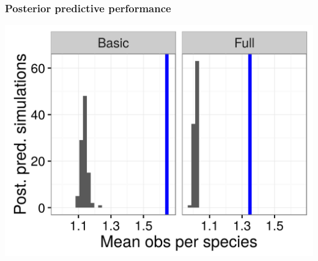 \documentclass{beamer}
\begin{document}
\begin{frame}
  \frametitle{Posterior predictive performance}
  \begin{center}
    \includegraphics[height=\textheight,width=\textwidth,keepaspectratio=true]{figure/pred_occ}
  \end{center}
\end{frame}
\end{document}
